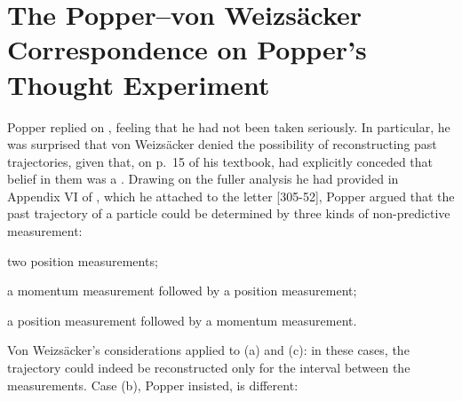 \documentclass[pdflatex]{sn-jnl}
\newcommand{\LdF}{\bt{Logik der Forschung}\xspace}
\newcommand{\vW}{von Weizsäcker\xspace}
\newcommand{\VW}{Von Weizsäcker\xspace}
\providecommand{\DIFaddbegin}{} %
\providecommand{\DIFaddend}{} %
\providecommand{\DIFdelbegin}{} %
\providecommand{\DIFdelend}{} %
\begin{document}
\DIFaddbegin \section{The Popper--\vW Correspondence on Popper's Thought Experiment}
\DIFaddend 

\DIFdelbegin %


\DIFdelend Popper replied on , feeling that he had not been taken seriously. In particular, he was surprised that \vW denied the possibility of reconstructing past trajectories, given that, on p.~15 of his textbook, \citet{Heisenberg1930} had explicitly conceded that belief in them was a . Drawing on the fuller analysis he had provided in Appendix VI of \LdF, which he attached to the letter [305-52], Popper argued that the past trajectory of a particle could be determined by three kinds of non-predictive measurement: \begin{inparaenum}[(a)] \item two position measurements; \item a momentum measurement followed by a position measurement; \item a position measurement followed by a momentum measurement. \end{inparaenum} \VW's considerations applied to (a) and (c): in these cases, the trajectory could indeed be reconstructed only for the interval between the measurements. Case (b), Popper insisted, is different:
\end{document}
